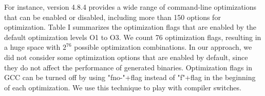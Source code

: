 
For instance, version 4.8.4 provides a wide range of command-line optimizations that can be enabled or disabled, including more than 150 options for optimization. 
Table I summarizes the optimization flags that are enabled by the default optimization levels O1 to O3.
We count 76 optimization flags, resulting in a huge space with $2^{76}$ possible optimization combinations.
In our approach, we did not consider some optimization options that are enabled by default, since they do not affect the performance of generated binaries.
Optimization flags in GCC can be turned off by using "fno-"+flag instead of "f"+flag in the beginning of each optimization. 
We use this technique to play with compiler switches.

